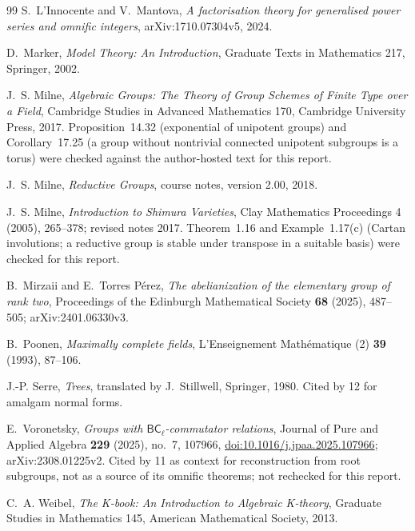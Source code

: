 \documentclass[11pt,oneside]{article}
\numberwithin{equation}{section}
\theoremstyle{definition}
\theoremstyle{remark}
\begin{document}
\begin{thebibliography}{99}
S.~L'Innocente and V.~Mantova, \emph{A factorisation theory for generalised power
series and omnific integers}, arXiv:1710.07304v5, 2024.

D.~Marker, \emph{Model Theory: An Introduction}, Graduate Texts in Mathematics 217,
Springer, 2002.

J.~S. Milne, \emph{Algebraic Groups: The Theory of Group Schemes of Finite Type over
a Field}, Cambridge Studies in Advanced Mathematics 170, Cambridge University
Press, 2017. Proposition~14.32 (exponential of unipotent groups) and
Corollary~17.25 (a group without nontrivial connected unipotent subgroups is a
torus) were checked against the author-hosted text for this report.

J.~S. Milne, \emph{Reductive Groups}, course notes, version 2.00, 2018.

J.~S. Milne, \emph{Introduction to Shimura Varieties}, Clay Mathematics Proceedings
4 (2005), 265--378; revised notes 2017. Theorem~1.16 and Example~1.17(c) (Cartan
involutions; a reductive group is stable under transpose in a suitable basis)
were checked for this report.

B.~Mirzaii and E.~Torres P\'erez, \emph{The abelianization of the elementary group
of rank two}, Proceedings of the Edinburgh Mathematical Society \textbf{68}
(2025), 487--505; arXiv:2401.06330v3.

B.~Poonen, \emph{Maximally complete fields}, L'Enseignement Math\'ematique (2)
\textbf{39} (1993), 87--106.

J.-P. Serre, \emph{Trees}, translated by J.~Stillwell, Springer, 1980. Cited by
12 for amalgam normal forms.

E.~Voronetsky, \emph{Groups with $\mathsf{BC}_\ell$-commutator relations}, Journal
of Pure and Applied Algebra \textbf{229} (2025), no.~7, 107966,
\href{https://doi.org/10.1016/j.jpaa.2025.107966}{doi:10.1016/j.jpaa.2025.107966};
arXiv:2308.01225v2. Cited by 11 as context for reconstruction from root
subgroups, not as a source of its omnific theorems; not rechecked for this report.

C.~A. Weibel, \emph{The K-book: An Introduction to Algebraic K-theory}, Graduate
Studies in Mathematics 145, American Mathematical Society, 2013.

\end{thebibliography}
\end{document}

